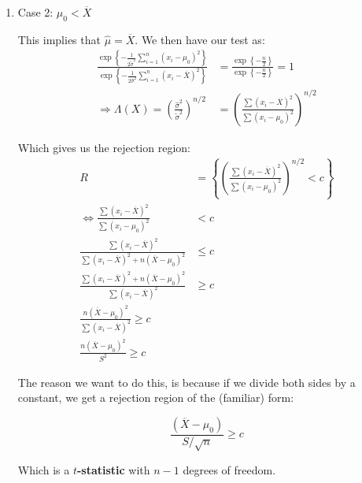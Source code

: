 \documentclass{article}
\begin{document}
\begin{enumerate}
\begin{enumerate}
        \item Case 2: $\mu_0 < \overline{X}$
            
        This implies that $\hat{\mu} = \overline{X}$. We then have our test as:
        \begin{equation*}
            \begin{split}
                \frac{\exp\left\{-\frac{1}{2\widetilde{\sigma}^2} \sum_{i=1}^n (x_i-\mu_0)^2\right\}}{\exp\left\{-\frac{1}{2\hat{\sigma}^2} \sum_{i=1}^n (x_i-\overline{X})^2\right\}} &= \frac{\exp\left\{ -\frac{n}{2}\right\}}{\exp\left\{ -\frac{n}{2} \right\}} = 1\\
               \Rightarrow \Lambda(X) = \left(\frac{\hat{\sigma}^2}{\widetilde{\sigma}^2} \right)^{n/2} &= \left(\frac{\sum (x_i-\overline{X})^2}{\sum (x_i-\mu_0)^2} \right)^{n/2}
            \end{split}
        \end{equation*}
        
        Which gives us the rejection region:
        \begin{equation*}
            \begin{split}
                  R &= \left\{ \left(\frac{\sum (x_i-\overline{X})^2}{\sum (x_i-\mu_0)^2} \right)^{n/2} < c \right\}\\
               \iff \frac{\sum (x_i-\overline{X})^2}{\sum (x_i-\mu_0)^2} &< c\\
               \frac{\sum (x_i-\overline{X})^2}{\sum(x_i-\overline{X})^2 + n(\overline{X}-\mu_0)^2} &\leq c\\
               \frac{\sum(x_i-\overline{X})^2 + n(\overline{X}-\mu_0)^2}{\sum (x_i-\overline{X})^2} &\geq c\\
               \frac{n(\overline{X}-\mu_0)^2}{\sum(x_i-\overline{X})^2} \geq c\\
               \frac{n(\overline{X}-\mu_0)^2}{S^2} \geq c
            \end{split}
        \end{equation*}
        
        The reason we want to do this, is because if we divide both sides by a constant, we get a rejection region of the (familiar) form:
        
        \begin{equation*}
            \frac{(\overline{X}-\mu_0)}{S/\sqrt{n}} \geq c
        \end{equation*}
        
        Which is a \textbf{$t$-statistic} with $n-1$ degrees of freedom.
        
    \end{enumerate}
\end{enumerate}
\end{document}
